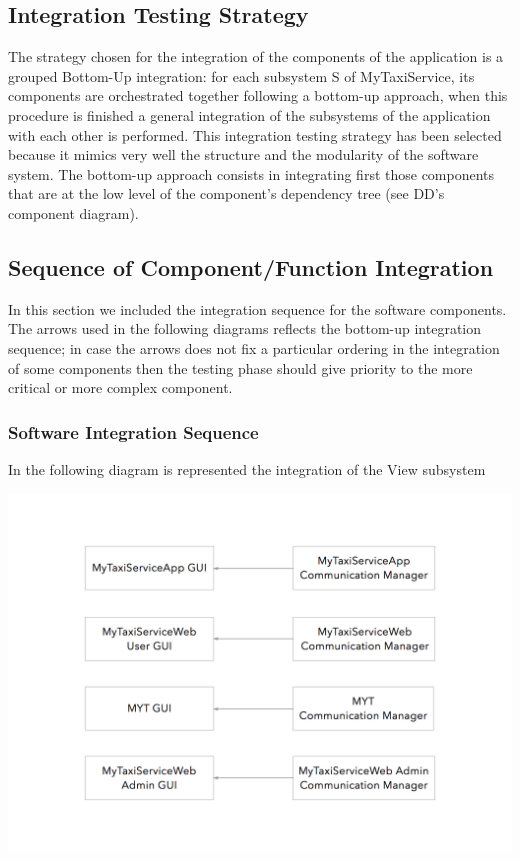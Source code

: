 \documentclass[11pt,titlepage]{article} %
\begin{document}
\subsection{Integration Testing Strategy}
  The strategy chosen for the integration of the components of the application is a grouped Bottom-Up integration: 
  for each subsystem S of MyTaxiService, its components are orchestrated together following a bottom-up approach, 
  when this procedure is finished a general integration of the subsystems of the application with each other is performed.\newline
  This integration testing strategy has been selected because it mimics very well the structure and the modularity of the software system.
  The bottom-up approach consists in integrating first those components that are at the low level of the component's dependency tree
  (see DD's component diagram).
  
\subsection{Sequence of Component/Function Integration} 
  In this section we included the integration sequence for the software components.\newline
  The arrows used in the following diagrams reflects the bottom-up integration sequence; in case the arrows does not fix a particular
  ordering in the integration of some components then the testing phase should give priority to the more critical or more complex component.
  
  \subsubsection{Software Integration Sequence}
    In the following diagram is represented the integration of the View subsystem\newline
    \begin{center}
      \includegraphics[scale=0.25]{Integration-1.png}
    \end{center}
    
\end{document}
